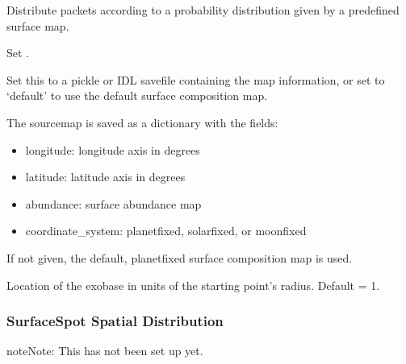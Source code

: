 \documentclass[letterpaper,10pt,english]{sphinxmanual}
\begin{document}
\sphinxAtStartPar
Distribute packets according to a probability distribution given by a
pre\sphinxhyphen{}defined surface map.
\begin{description}
\sphinxAtStartPar
Set .

\sphinxAtStartPar
Set this to a pickle or IDL savefile containing the map information, or
set to ‘default’ to use the default surface composition map.

\sphinxAtStartPar
The sourcemap is saved as a dictionary with the fields:
\begin{itemize}
\item {} 
\sphinxAtStartPar
longitude: longitude axis in degrees

\item {} 
\sphinxAtStartPar
latitude: latitude axis in degrees

\item {} 
\sphinxAtStartPar
abundance: surface abundance map

\item {} 
\sphinxAtStartPar
coordinate\_system: planet\sphinxhyphen{}fixed, solar\sphinxhyphen{}fixed, or moon\sphinxhyphen{}fixed

\end{itemize}

\sphinxAtStartPar
If not given, the default, planet\sphinxhyphen{}fixed surface composition map is used.

\sphinxAtStartPar
Location of the exobase in units of the starting point’s radius.
Default = 1.

\end{description}


\subsubsection{Surface\sphinxhyphen{}Spot Spatial Distribution}
\label{\detokenize{nexoclom2/inputfiles:surface-spot-spatial-distribution}}\label{\detokenize{nexoclom2/inputfiles:surfacespotspatdist}}
\begin{sphinxadmonition}{note}{Note:}
\sphinxAtStartPar
This has not been set up yet.
\end{sphinxadmonition}
\end{document}
